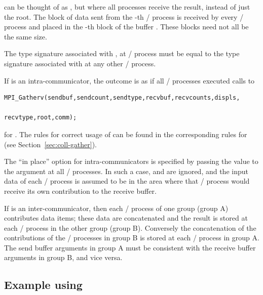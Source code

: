  can be thought of as , but
where all processes receive the result, instead of just the root.
The block of data sent from the
-th
\MPI/ process is received by every \MPI/ process and placed in the
-th
block of the buffer .
These blocks need not all be the same size.


The type signature associated with ,
at \MPI/ process  must be equal to the type signature associated with
 at any other \MPI/ process.

If  is an intra-communicator,
the outcome is as if all \MPI/ processes executed calls to
\begin{lstlisting}[language={[MPI]C}]
    MPI_Gatherv(sendbuf,sendcount,sendtype,recvbuf,recvcounts,displs,
                                                   recvtype,root,comm);
\end{lstlisting}
for .  The rules for correct usage of
 can be found in the corresponding rules
for  (see Section~\ref{sec:coll-gather}).

The ``in place'' option  for intra-communicators is specified by passing the
value
 to the argument  at all \MPI/ processes.
In such a case,  and  are ignored, and the input data
of each \MPI/ process is assumed to be in the area where that
\MPI/ process would receive its own contribution to the receive
buffer.

If  is an inter-communicator, then each \MPI/ process
of one group (group A) contributes 
data items; these data are concatenated and the result
is stored at each \MPI/ process in the other
group (group B).  Conversely the concatenation of the
contributions of the \MPI/ processes in group B is stored at each \MPI/ process in
group A.   The send buffer arguments in group A must be consistent
with the receive buffer arguments in group B, and vice versa.

\subsection{Example using \texorpdfstring{}{MPI\_ALLGATHER}}
\label{coll:allgather-ex}

